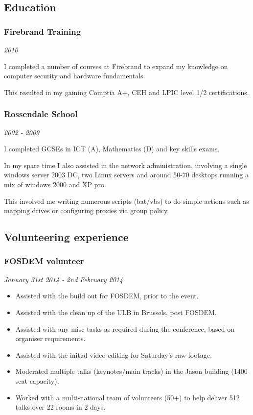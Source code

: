 \subsection{Education}\label{education}

\subsubsection{Firebrand Training}\label{firebrand-training}

\emph{2010}

I completed a number of courses at Firebrand to expand my knowledge on
computer security and hardware fundamentals.

This resulted in my gaining Comptia A+, CEH and LPIC level 1/2
certifications.

\subsubsection{Rossendale School}\label{rossendale-school}

\emph{2002 - 2009}

I completed GCSEs in ICT (A), Mathematics (D) and key skills exams.

In my spare time I also assisted in the network administration,
involving a single windows server 2003 DC, two Linux servers and around
50-70 desktops running a mix of windows 2000 and XP pro.

This involved me writing numerous scripts (bat/vbs) to do simple actions
such as mapping drives or configuring proxies via group policy.

\subsection{Volunteering experience}\label{volunteering-experience}

\subsubsection{FOSDEM volunteer}\label{fosdem-volunteer}

\emph{January 31st 2014 - 2nd February 2014}

\begin{itemize}
\itemsep1pt\parskip0pt
\item
  Assisted with the build out for FOSDEM, prior to the event.
\item
  Assisted with the clean up of the ULB in Brussels, post FOSDEM.
\item
  Assisted with any misc tasks as required during the conference, based
  on organiser requirements.
\item
  Assisted with the initial video editing for Saturday's raw footage.
\item
  Moderated multiple talks (keynotes/main tracks) in the Jason building
  (1400 seat capacity).
\item
  Worked with a multi-national team of volunteers (50+) to help deliver
  512 talks over 22 rooms in 2 days.
\end{itemize}

